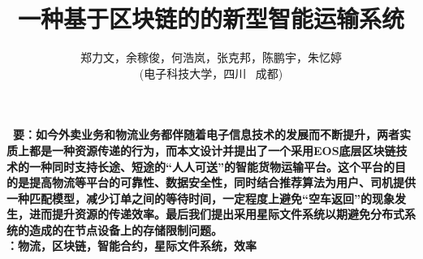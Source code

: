 \documentclass[UTF8]{ctexart}
\title{\textbf{一种基于区块链的的新型智能运输系统}}
\author{\sffamily 郑力文，余稼俊，何浩岚，张克邦，陈鹏宇，朱忆婷\\ \sffamily(电子科技大学，四川 \ 成都)}
\date{}
\begin{document}
  \maketitle
  \textbf{ \ 要：\heiti  \small 如今外卖业务和物流业务都伴随着电子信息技术的发展而不断提升，两者实质上都是一种资源传递的行为，而本文设计并提出了一个采用EOS底层区块链技术的一种同时支持长途、短途的“人人可送”的智能货物运输平台。这个平台的目的是提高物流等平台的可靠性、数据安全性，同时结合推荐算法为用户、司机提供一种匹配模型，减少订单之间的等待时间，一定程度上避免“空车返回”的现象发生，进而提升资源的传递效率。最后我们提出采用星际文件系统以期避免分布式系统的造成的在节点设备上的存储限制问题。}
  \\
  \indent \textbf{：\heiti  \small 物流，区块链，智能合约，星际文件系统，效率}
  \pagestyle{plain}	%
  \\
  \\




\end{document}
